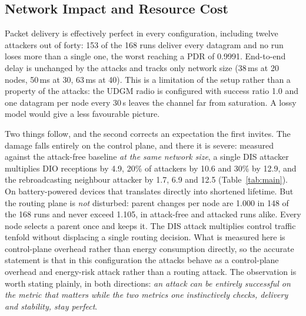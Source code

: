 \documentclass[11pt, a4paper]{article}
\begin{document}
\subsection{Network Impact and Resource Cost}
\label{sec:overhead}

Packet delivery is effectively perfect in every configuration, including twelve attackers out of forty: 153 of the 168 runs deliver every datagram and no run loses more than a single one, the worst reaching a PDR of 0.9991. End-to-end delay is unchanged by the attacks and tracks only network size (38\,ms at 20 nodes, 50\,ms at 30, 63\,ms at 40). This is a limitation of the setup rather than a property of the attacks: the UDGM radio is configured with success ratio 1.0 and one datagram per node every 30\,s leaves the channel far from saturation. A lossy model would give a less favourable picture.

Two things follow, and the second corrects an expectation the first invites. The damage falls entirely on the control plane, and there it is severe: measured against the attack-free baseline \textit{at the same network size}, a single DIS attacker multiplies DIO receptions by 4.9, 20\% of attackers by 10.6 and 30\% by 12.9, and the rebroadcasting neighbour attacker by 1.7, 6.9 and 12.5 (Table~\ref{tab:main}). On battery-powered devices that translates directly into shortened lifetime. But the routing plane is \textit{not} disturbed: parent changes per node are 1.000 in 148 of the 168 runs and never exceed 1.105, in attack-free and attacked runs alike. Every node selects a parent once and keeps it. The DIS attack multiplies control traffic tenfold without displacing a single routing decision. What is measured here is control-plane overhead rather than energy consumption directly, so the accurate statement is that in this configuration the attacks behave as a control-plane overhead and energy-risk attack rather than a routing attack. The observation is worth stating plainly, in both directions: \textit{an attack can be entirely successful on the metric that matters while the two metrics one instinctively checks, delivery and stability, stay perfect}.
\end{document}
